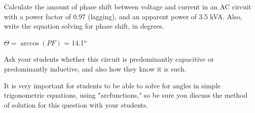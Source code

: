 

Calculate the amount of phase shift between voltage and current in an AC circuit with a power factor of 0.97 (lagging), and an apparent power of 3.5 kVA.  Also, write the equation solving for phase shift, in degrees.







$\Theta = \arccos (PF)$ = 14.1$^{o}$







Ask your students whether this circuit is predominantly capacitive or predominantly inductive, and also how they know it is such.

It is very important for students to be able to solve for angles in simple trigonometric equations, using "arcfunctions," so be sure you discuss the method of solution for this question with your students.




